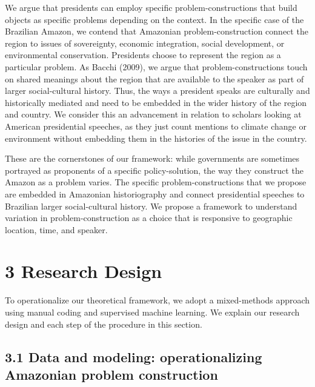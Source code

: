 \documentclass[]{interact}
\theoremstyle{plain}%
\theoremstyle{definition}
\theoremstyle{remark}
\begin{document}
We argue that presidents can employ specific problem-constructions that
build objects as specific problems depending on the context. In the
specific case of the Brazilian Amazon, we contend that Amazonian
problem-construction connect the region to issues of sovereignty,
economic integration, social development, or environmental conservation.
Presidents choose to represent the region as a particular problem. As
Bacchi (2009), we argue that problem-constructions touch on shared
meanings about the region that are available to the speaker as part of
larger social-cultural history. Thus, the ways a president speaks are
culturally and historically mediated and need to be embedded in the
wider history of the region and country. We consider this an advancement
in relation to scholars looking at American presidential speeches, as
they just count mentions to climate change
\citep{calderwood2019, calderwood2020, brown2017} or environment
\citep{bevitori2015} without embedding them in the histories of the
issue in the country.

These are the cornerstones of our framework: while governments are
sometimes portrayed as proponents of a specific policy-solution, the way
they construct the Amazon as a problem varies. The specific
problem-constructions that we propose are embedded in Amazonian
historiography and connect presidential speeches to Brazilian larger
social-cultural history. We propose a framework to understand variation
in problem-construction as a choice that is responsive to geographic
location, time, and speaker.

\hypertarget{research-design}{%
\section{3 Research Design}\label{research-design}}

To operationalize our theoretical framework, we adopt a mixed-methods
approach using manual coding and supervised machine learning. We explain
our research design and each step of the procedure in this section.

\hypertarget{data-and-modeling-operationalizing-amazonian-problem-construction}{%
\subsection{3.1 Data and modeling: operationalizing Amazonian problem
construction}\label{data-and-modeling-operationalizing-amazonian-problem-construction}}
\end{document}

